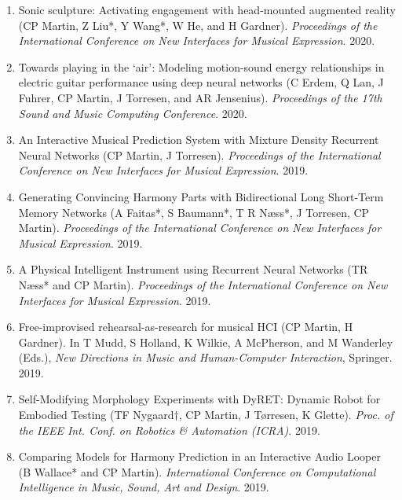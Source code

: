 \documentclass[11pt, a4paper, oneside]{article}
\begin{document}
\begin{enumerate}
\item Sonic sculpture: Activating engagement with head-mounted
  augmented reality (CP Martin, Z Liu*, Y Wang*, W He, and H
  Gardner). \emph{Proceedings of the International Conference on New
  Interfaces for Musical Expression}. 2020. 

\item Towards playing in the `air': Modeling motion-sound energy
  relationships in electric guitar performance using deep neural
  networks (C Erdem, Q Lan, J Fuhrer, CP Martin, J Torresen,
  and AR Jensenius). \emph{Proceedings of the 17th Sound and Music
    Computing Conference}. 2020. 
  
\item An Interactive Musical Prediction System with Mixture Density
  Recurrent Neural Networks (CP Martin, J Torresen).
  \emph{Proceedings of the International Conference on New Interfaces
  for Musical Expression}. 2019.  

\item Generating Convincing Harmony Parts with Bidirectional Long
  Short-Term Memory Networks (A Faitas*, S Baumann*, T R Næss*, J
  Torresen, CP Martin). \emph{Proceedings of the International
  Conference on New Interfaces for Musical Expression}. 2019. 
 
\item A Physical Intelligent Instrument using Recurrent Neural
  Networks (TR Næss* and CP Martin). \emph{Proceedings of the
    International Conference on New Interfaces for Musical
Expression}. 2019. 

\item Free-improvised rehearsal-as-research for musical HCI (CP
  Martin, H Gardner). In T Mudd, S Holland, K Wilkie, A
  McPherson, and M Wanderley (Eds.), \emph{New Directions in Music
    and Human-Computer Interaction}, Springer. 2019.
  
\item Self-Modifying Morphology Experiments with DyRET: Dynamic Robot
  for Embodied Testing (TF Nygaard$\dagger$, CP Martin, J
  Tørresen, K Glette). \emph{Proc. of the IEEE Int. Conf. on Robotics
  \& Automation (ICRA)}. 2019.  

\item Comparing Models for Harmony Prediction in an Interactive Audio
  Looper (B Wallace* and CP Martin). \emph{International Conference on
    Computational Intelligence in Music, Sound, Art and Design}. 2019.


\end{enumerate}
\end{document}
